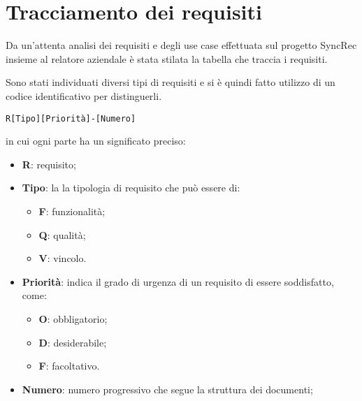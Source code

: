 \section{Tracciamento dei requisiti}\label{tracciamento-requisiti}

Da un'attenta analisi dei requisiti e degli use case effettuata sul progetto SyncRec insieme al relatore aziendale è stata stilata la tabella che traccia i requisiti.

Sono stati individuati diversi tipi di requisiti e si è quindi fatto utilizzo di un codice identificativo per distinguerli.


\begin{center}
	\texttt{R[Tipo][Priorità]-[Numero]}
\end{center}
in cui ogni parte ha un significato preciso:
\begin{itemize}
	\item \textbf{R}: requisito;
	\item \textbf{Tipo}: la la tipologia di requisito che può essere di:
	\begin{itemize}
		\item \textbf{F}: funzionalità;
		\item \textbf{Q}: qualità;
		\item \textbf{V}: vincolo.
	\end{itemize}
	\item \textbf{Priorità}: indica il grado di urgenza di un requisito di essere soddisfatto, come:
	\begin{itemize}
		\item \textbf{O}: obbligatorio;
		\item \textbf{D}: desiderabile;
		\item \textbf{F}: facoltativo.
	\end{itemize}
	\item \textbf{Numero}: numero progressivo che segue la struttura dei documenti;
\end{itemize}

